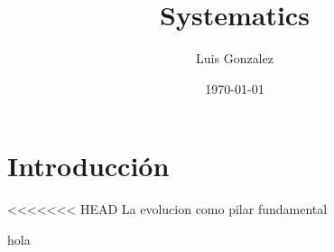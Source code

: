 \documentclass[12pt]{article}
\title{Systematics}
\author{Luis Gonzalez}
\date{\today}
\begin{document}
\maketitle

\section{Introducción}
<<<<<<< HEAD
La evolucion como pilar fundamental 

hola
\end{document}
